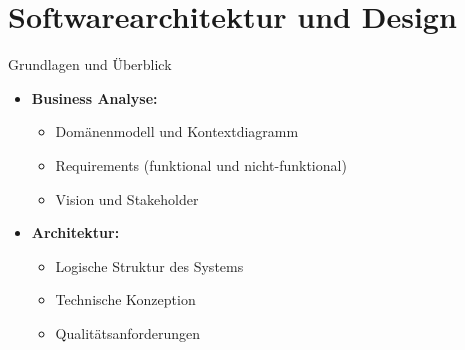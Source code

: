 \section{Softwarearchitektur und Design}

\begin{concept}{Grundlagen und Überblick}
\begin{itemize}
    \item \textbf{Business Analyse:}
    \begin{itemize}
        \item Domänenmodell und Kontextdiagramm
        \item Requirements (funktional und nicht-funktional)
        \item Vision und Stakeholder
    \end{itemize}
    
    \item \textbf{Architektur:}
    \begin{itemize}
        \item Logische Struktur des Systems
        \item Technische Konzeption
        \item Qualitätsanforderungen
    \end{itemize}
    

\end{itemize}
\end{concept}
